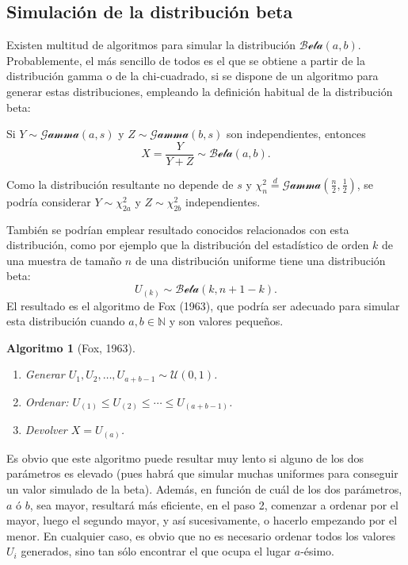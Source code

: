 \documentclass[
]{book}
\theoremstyle{break}
\newtheorem{conjecture}{Algoritmo}[chapter]
\theoremstyle{nonumberplain}
\begin{document}
\hypertarget{simulaciuxf3n-de-la-distribuciuxf3n-beta}{%
\subsection{Simulación de la distribución beta}\label{simulaciuxf3n-de-la-distribuciuxf3n-beta}}

Existen multitud de algoritmos para simular la distribución \(\mathcal{Beta}(a, b)\).
Probablemente, el más sencillo de todos es el que se obtiene a partir de la distribución gamma o de la chi-cuadrado, si se dispone de un algoritmo para generar estas distribuciones, empleando la definición habitual de la distribución beta:

Si \(Y \sim \mathcal{Gamma}(a, s)\) y \(Z \sim \mathcal{Gamma}(b, s)\) son independientes, entonces \[X=\frac{Y}{Y+Z} \sim \mathcal{Beta}(a, b).\]

Como la distribución resultante no depende de \(s\) y \(\chi^2_{n} \overset{d}{=} \mathcal{Gamma}\left(\tfrac{n}{2}, \tfrac{1}{2}\right)\), se podría considerar \(Y \sim \chi^2_{2a}\) y \(Z \sim \chi^2_{2b}\) independientes.

También se podrían emplear resultado conocidos relacionados con esta distribución, como por ejemplo que la distribución del estadístico de orden \(k\) de una muestra de tamaño \(n\) de una distribución uniforme tiene una distribución beta:
\[U_{(k)} \sim \mathcal{Beta}(k,n+1-k).\]
El resultado es el algoritmo de Fox (1963), que podría ser adecuado para simular esta distribución cuando \(a, b \in \mathbb{N}\) y son valores pequeños.

\begin{conjecture}[Fox, 1963]
\protect\hypertarget{cnj:fox}{}\label{cnj:fox}

\begin{enumerate}
\def\labelenumi{\arabic{enumi}.}
\item
  Generar \(U_1, U_2, \ldots, U_{a+b-1} \sim \mathcal{U}(0, 1)\).
\item
  Ordenar: \(U_{(1)}\leq U_{(2)}\leq\cdots\leq U_{(a+b-1)}\).
\item
  Devolver \(X=U_{(a)}\).
\end{enumerate}

\end{conjecture}

Es obvio que este algoritmo puede resultar muy lento si alguno de los dos parámetros es elevado (pues habrá que simular muchas uniformes para conseguir un valor simulado de la beta).
Además, en función de cuál de los dos parámetros, \(a\) ó \(b\), sea mayor, resultará más eficiente, en el paso 2, comenzar a ordenar por el mayor, luego el segundo mayor, y así sucesivamente, o hacerlo empezando por el menor.
En cualquier caso, es obvio que no es necesario ordenar todos los valores \(U_{i}\) generados, sino tan sólo encontrar el que ocupa el lugar \(a\)-ésimo.
\end{document}
